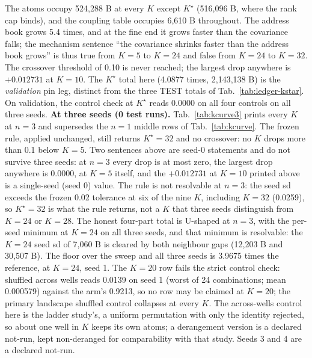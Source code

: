 \documentclass{article} %
\newcommand{\Kstar}{\ensuremath{K^{\star}}}
\begin{document}
\noindent The atoms occupy 524,288 B at every $K$ except $\Kstar$ (516,096 B, where the rank cap
binds), and the coupling table occupies 6,610 B throughout. The address book grows 5.4 times, and
at the fine end it grows faster than the covariance falls; the mechanism sentence ``the
covariance shrinks faster than the address book grows'' is thus true from $K=5$ to $K=24$ and
false from $K=24$ to $K=32$. The crossover threshold of 0.10 is never reached; the largest drop
anywhere is $+0.012731$ at $K=10$. The $\Kstar$ total here (4.0877 times, 2,143,138 B) is the
\emph{validation} pin leg, distinct from the three TEST totals of Tab.~\ref{tab:ledger-kstar}. %
On validation, the control check at $\Kstar$ reads 0.0000 on all four controls on all three seeds.
\textbf{At three seeds (0 test runs).} Tab.~\ref{tab:kcurve3} prints
every $K$ at $n=3$ and supersedes the $n=1$ middle rows of Tab.~\ref{tab:kcurve}.
The frozen rule, applied unchanged, still returns $\Kstar=32$ and no crossover: no $K$ drops more
than 0.1 below $K=5$. Two sentences above are seed-0 statements and do not survive three seeds: at
$n=3$ every drop is at most zero, the largest drop anywhere is 0.0000, at $K=5$ itself, and the
$+0.012731$ at $K=10$ printed above is a single-seed (seed 0) value. The rule is not resolvable at $n=3$: the seed sd
exceeds the frozen 0.02 tolerance at six of the nine $K$, including $K=32$ (0.0259), so $\Kstar=32$
is what the rule returns, not a $K$ that three seeds distinguish from $K=24$ or $K=28$. The honest
four-part total is U-shaped at $n=3$, with the per-seed minimum at $K=24$ on all three seeds, and
that minimum is resolvable: the $K=24$ seed sd of 7,060 B is cleared by both neighbour gaps (12,203
B and 30,507 B). The floor over the sweep and all three seeds is 3.9675 times the reference, at
$K=24$, seed 1. The $K=20$ row fails the strict control check:
shuffled across wells reads 0.0139 on seed 1 (worst of 24 combinations; mean
0.000579) against the arm's 0.9213, so no row may be claimed at $K=20$; the primary
landscape shuffled control collapses at every $K$. The across-wells control here is
the ladder study's, a uniform permutation with only the identity rejected, so about one well in $K$ keeps its
own atoms; a derangement version is a declared not-run, kept non-deranged for comparability with
that study. Seeds 3 and 4 are a declared not-run.
\end{document}
